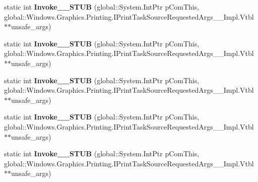 \begin{DoxyCompactItemize}
\item 
\mbox{\label{struct_windows_1_1_graphics_1_1_printing_1_1_print_task_source_requested_handler_____impl_1_1_vtbl_a8878647d49b410a755d6a28174a3e160}} 
static int {\bfseries Invoke\+\_\+\+\_\+\+S\+T\+UB} (global\+::\+System.\+Int\+Ptr p\+Com\+This, global\+::\+Windows.\+Graphics.\+Printing.\+I\+Print\+Task\+Source\+Requested\+Args\+\_\+\+\_\+\+Impl.\+Vtbl $\ast$$\ast$unsafe\+\_\+args)
\item 
\mbox{\label{struct_windows_1_1_graphics_1_1_printing_1_1_print_task_source_requested_handler_____impl_1_1_vtbl_a8878647d49b410a755d6a28174a3e160}} 
static int {\bfseries Invoke\+\_\+\+\_\+\+S\+T\+UB} (global\+::\+System.\+Int\+Ptr p\+Com\+This, global\+::\+Windows.\+Graphics.\+Printing.\+I\+Print\+Task\+Source\+Requested\+Args\+\_\+\+\_\+\+Impl.\+Vtbl $\ast$$\ast$unsafe\+\_\+args)
\item 
\mbox{\label{struct_windows_1_1_graphics_1_1_printing_1_1_print_task_source_requested_handler_____impl_1_1_vtbl_a8878647d49b410a755d6a28174a3e160}} 
static int {\bfseries Invoke\+\_\+\+\_\+\+S\+T\+UB} (global\+::\+System.\+Int\+Ptr p\+Com\+This, global\+::\+Windows.\+Graphics.\+Printing.\+I\+Print\+Task\+Source\+Requested\+Args\+\_\+\+\_\+\+Impl.\+Vtbl $\ast$$\ast$unsafe\+\_\+args)
\item 
\mbox{\label{struct_windows_1_1_graphics_1_1_printing_1_1_print_task_source_requested_handler_____impl_1_1_vtbl_a8878647d49b410a755d6a28174a3e160}} 
static int {\bfseries Invoke\+\_\+\+\_\+\+S\+T\+UB} (global\+::\+System.\+Int\+Ptr p\+Com\+This, global\+::\+Windows.\+Graphics.\+Printing.\+I\+Print\+Task\+Source\+Requested\+Args\+\_\+\+\_\+\+Impl.\+Vtbl $\ast$$\ast$unsafe\+\_\+args)
\item 
\mbox{\label{struct_windows_1_1_graphics_1_1_printing_1_1_print_task_source_requested_handler_____impl_1_1_vtbl_a8878647d49b410a755d6a28174a3e160}} 
static int {\bfseries Invoke\+\_\+\+\_\+\+S\+T\+UB} (global\+::\+System.\+Int\+Ptr p\+Com\+This, global\+::\+Windows.\+Graphics.\+Printing.\+I\+Print\+Task\+Source\+Requested\+Args\+\_\+\+\_\+\+Impl.\+Vtbl $\ast$$\ast$unsafe\+\_\+args)
\end{DoxyCompactItemize}
